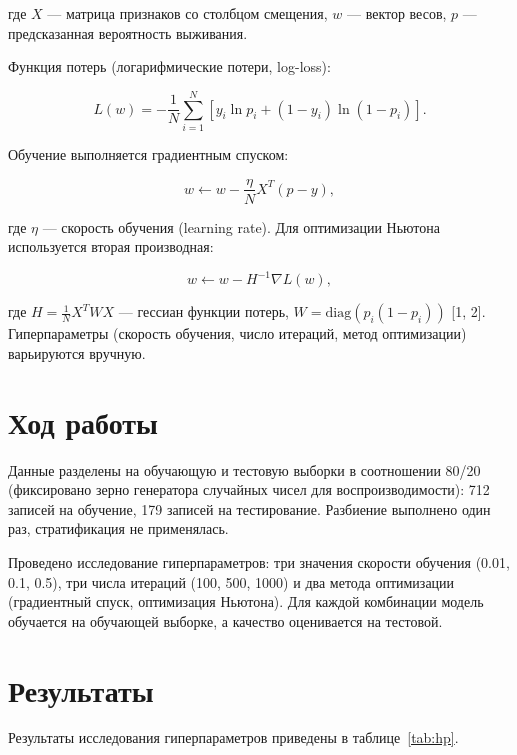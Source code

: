 \documentclass[12pt,a4paper]{article}
\begin{document}
где \(X\) --- матрица признаков со столбцом смещения, \(w\) --- вектор весов, \(p\) --- предсказанная вероятность выживания.

Функция потерь (логарифмические потери, log-loss):

\begin{equation}
L(w) = -\frac{1}{N}\sum_{i=1}^{N}\left[y_i\ln p_i + (1-y_i)\ln(1-p_i)\right].
\end{equation}

Обучение выполняется градиентным спуском:

\begin{equation}
w \leftarrow w - \frac{\eta}{N}X^T(p-y),
\end{equation}

где \(\eta\) --- скорость обучения (learning rate). Для оптимизации Ньютона используется вторая производная:

\begin{equation}
w \leftarrow w - H^{-1}\nabla L(w),
\end{equation}

где \(H = \frac{1}{N}X^T W X\) --- гессиан функции потерь, \(W = \mathrm{diag}(p_i(1-p_i))\) [1, 2]. Гиперпараметры (скорость обучения, число итераций, метод оптимизации) варьируются вручную.

\section{Ход работы}
Данные разделены на обучающую и тестовую выборки в соотношении 80/20 (фиксировано зерно генератора случайных чисел для воспроизводимости): 712 записей на обучение, 179 записей на тестирование. Разбиение выполнено один раз, стратификация не применялась.

Проведено исследование гиперпараметров: три значения скорости обучения (0.01, 0.1, 0.5), три числа итераций (100, 500, 1000) и два метода оптимизации (градиентный спуск, оптимизация Ньютона). Для каждой комбинации модель обучается на обучающей выборке, а качество оценивается на тестовой.

\section{Результаты}
Результаты исследования гиперпараметров приведены в таблице~\ref{tab:hp}.
\end{document}
